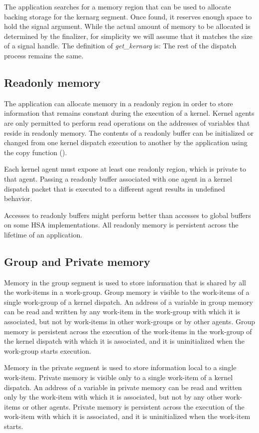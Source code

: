 \documentclass[oneside]{book}
\begin{document}
The application searches for a memory region that can be used to allocate
backing storage for the kernarg segment. Once found, it reserves enough space to
hold the signal argument. While the actual amount of memory to be allocated is
determined by the finalizer, for simplicity we will assume that it matches the
size of a signal handle.
The definition of \textit{get_kernarg} is:
The rest of the dispatch process remains the same.

\subsection{Readonly memory}
The application can allocate memory in a readonly region in order to store
information that remains constant during the execution of a kernel. Kernel
agents are only permitted to perform read operations on the addresses of
variables that reside in readonly memory.  The contents of a readonly buffer can
be initialized or changed from one kernel dispatch execution to another by the
application using the copy function ().

Each kernel agent must expose at least one readonly region, which is private to
that agent. Passing a readonly buffer associated with one agent in a kernel
dispatch packet that is executed to a different agent results in undefined
behavior.

Accesses to readonly buffers might perform better than accesses to global
buffers on some HSA implementations. All readonly memory is persistent across
the lifetime of an application.

\subsection{Group and Private memory}
Memory in the group segment is used to store information that is shared by all
the work-items in a work-group. Group memory is visible to the work-items of a
single work-group of a kernel dispatch. An address of a variable in group memory
can be read and written by any work-item in the work-group with which it is
associated, but not by work-items in other work-groups or by other agents. Group
memory is persistent across the execution of the work-items in the work-group of
the kernel dispatch with which it is associated, and it is uninitialized
when the work-group starts execution.

Memory in the private segment is used to store information local to a single
work-item. Private memory is visible only to a single work-item of a kernel
dispatch. An address of a variable in private memory can be read and written
only by the work-item with which it is associated, but not by any other
work-items or other agents.  Private memory is persistent across the execution
of the work-item with which it is associated, and it is uninitialized
when the work-item starts.
\end{document}
